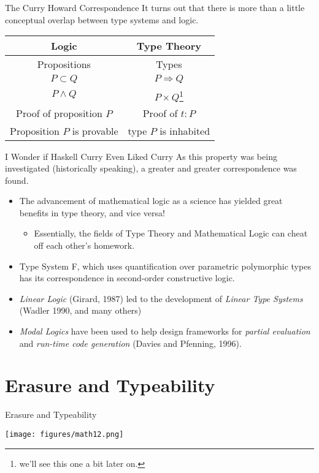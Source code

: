 \documentclass[11pt]{beamer}
\begin{document}
\begin{frame}[fragile=singleslide]{The Curry Howard Correspondence}
It turns out that there is more than a little conceptual overlap between type systems and logic.\\
\vspace{1em}
\begin{center}
\begin{tabular}{ c | c }
Logic & Type Theory \\ \hline
Propositions & Types \\ 
$P \subset Q$ & $P \Rightarrow Q$ \\
$P \land Q$ & $P \times Q$\footnote{we'll see this one a bit later on.} \\
Proof of proposition $P$ & Proof of $t : P$ \\ 
Proposition $P$ is provable & type $P$ is inhabited \\
\end{tabular}
\end{center}

\end{frame}

\begin{frame}[fragile=singleslide]{I Wonder if Haskell Curry Even Liked Curry}
As this property was being investigated (historically speaking), a greater and greater correspondence was found.  
\begin{itemize}
\item The advancement of mathematical logic as a science has yielded great benefits in type theory, and vice versa! 
\begin{itemize}
\item Essentially, the fields of Type Theory and Mathematical Logic can cheat off each other's homework.  
\end{itemize}
\item Type System F, which uses quantification over parametric polymorphic types has its correspondence in second-order constructive logic. 
\item \emph{Linear Logic} (Girard, 1987) led to the development of \emph{Linear Type Systems} (Wadler 1990, and many others)
\item \emph{Modal Logics} have been used to help design frameworks for \emph{partial evaluation} and \emph{run-time code generation} (Davies and Pfenning, 1996). 
\end{itemize}
\end{frame}

\section[Erasure]{Erasure and Typeability}
\begin{frame}[fragile=singleslide]{Erasure and Typeability}
\begin{center}
\texttt{[image: figures/math12.png]} 
\end{center}
\end{frame}
\end{document}
